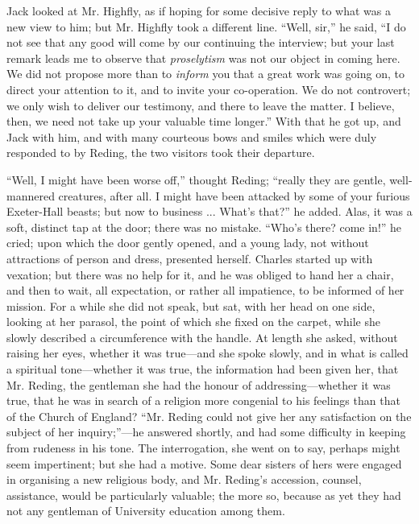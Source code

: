 Jack looked at Mr. Highfly, as if hoping for some decisive reply to
what was a new view to him; but Mr. Highfly took a different line.
``Well, sir,'' he said, ``I do not see that any good will
come by our continuing the interview; but your last remark leads
me to observe that \emph{proselytism} was not our object in coming
here. We did not propose more than to \emph{inform} you that a great
work was going on, to direct your attention to it, and to invite your
co-operation. We do not controvert; we only wish to deliver our
testimony, and there to leave the matter. I believe, then, we need not
take up your valuable time longer.'' With that he got up, and Jack
with him, and with many courteous bows and smiles which were duly
responded to by Reding, the two visitors took their departure.

``Well, I might have been worse off,'' thought Reding;
``really they are gentle, well-mannered creatures, after all. I
might have been attacked by some of your furious Exeter-Hall beasts;
but now to business ... What's that?'' he added. Alas, it was a
soft, distinct tap at the door; there was no mistake. ``Who's
there? come in!'' he cried; upon which the door gently opened, and
a young lady, not without attractions of person and dress, presented
herself. Charles started up with vexation; but there was no help for
it, and he was obliged to hand her a chair, and then to wait, all
expectation, or rather all impatience, to be informed of her mission.
For a while she did not speak, but sat, with her head on one side,
looking at her parasol, the point of which she fixed on the carpet,
while she slowly described a circumference with the handle. At length
she asked, without raising her eyes, whether it was true—and she
spoke slowly, and in what is called a spiritual tone—whether it was
true, the information had been given her, that Mr. Reding, the
gentleman she had the honour of addressing—whether it was true, that
he was in search of a religion more congenial to his feelings than
that of the Church of England? ``Mr. Reding could not give her any
satisfaction on the subject of her inquiry;''—he answered
shortly, and had some difficulty in keeping from rudeness in his tone.
The interrogation, she went on to say, perhaps might seem impertinent;
but she had a motive. Some dear sisters of hers were engaged in
organising a new religious body, and Mr. Reding's accession, counsel,
assistance, would be particularly valuable; the more so, because as
yet they had not any gentleman of University education among them.

